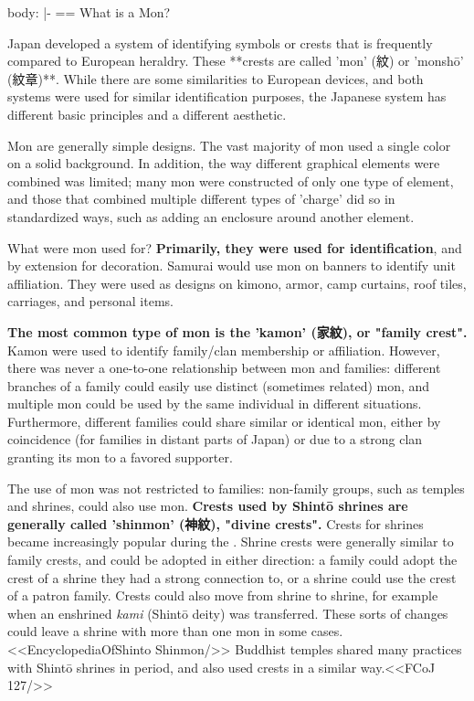 body: |-
  == What is a Mon?

  Japan developed a system of identifying symbols or crests that is
  frequently compared to European heraldry.  These **crests are called
  'mon' (紋) or 'monshō' (紋章)**. While there are some
  similarities to European devices, and both systems were used for
  similar identification purposes, the Japanese system has different
  basic principles and a different aesthetic.

  Mon are generally simple designs.  The vast majority
  of mon used a single color on a solid background.  In addition, the way
  different graphical elements were combined was limited; many mon
  were constructed of only one type of element, and those that
  combined multiple different types of 'charge' did so in standardized
  ways, such as adding an enclosure around another element.

  What were mon used for?  \textbf{Primarily, they were used for
  identification}, and by extension for decoration.  Samurai would use
  mon on banners to identify unit affiliation.  They were used as
  designs on kimono, armor, camp curtains, roof tiles, carriages, and
  personal items.

  \textbf{The most common type of mon is the 'kamon' (家紋), or
  "family crest".}
  Kamon were used to identify family/clan membership or affiliation.
  However, there was never a one-to-one relationship between mon and
  families: different branches of a family could easily use distinct
  (sometimes related) mon, and multiple mon could be used by the same
  individual in different situations.  Furthermore, different families
  could share similar or identical mon, either by coincidence (for
  families in distant parts of Japan) or due to a strong clan granting
  its mon to a favored supporter.
  
  The use of mon was
  not restricted to families: non-family groups, such as temples and
  shrines, could also use mon.
  \textbf{Crests used by Shintō shrines are generally called 'shinmon'
  (神紋), "divine crests".}  Crests for shrines
  became increasingly popular
  during the \KamakuraPeriod.  Shrine crests were generally similar to
  family crests, and could be adopted in either direction: a family
  could adopt the crest of a shrine they had a strong connection to,
  or a shrine could use the crest of a patron family.  Crests could
  also move from shrine to shrine, for example when an enshrined \emph{kami}
  (Shint\=o deity) was transferred.  These sorts of changes could
  leave a shrine with more than one mon in some
  cases.<<EncyclopediaOfShinto Shinmon/>> Buddhist temples shared
  many practices with Shintō shrines in period, and also used
  crests in a similar way.<<FCoJ 127/>>

